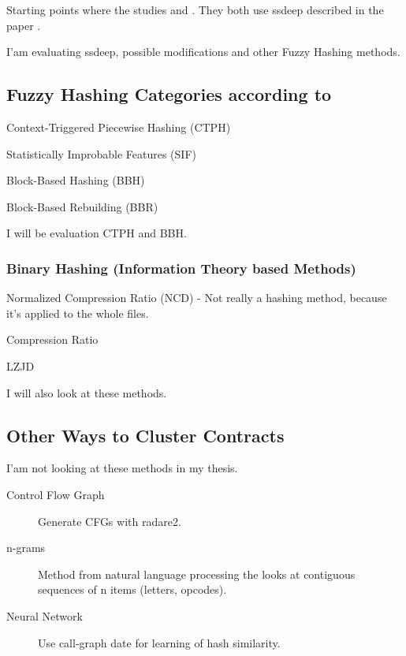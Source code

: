 \documentclass[../main.tex]{subfiles}
\begin{document}
Starting points where the studies  and .
They both use ssdeep\cite{ssdeep} described in the paper .

I'am evaluating ssdeep, possible modifications and other Fuzzy Hashing methods.

\subsection{Fuzzy Hashing Categories according to }
\begin{ul}
  \item Context-Triggered Piecewise Hashing (CTPH)
  \item Statistically Improbable Features (SIF)
  \item Block-Based Hashing (BBH)
  \item Block-Based Rebuilding (BBR)
\end{ul}
I will be evaluation CTPH and BBH.

\subsubsection{Binary Hashing (Information Theory based Methods)}
\begin{ul}
  \item Normalized Compression Ratio (NCD) - Not really a hashing method, because it's applied to the whole files.
  \item Compression Ratio
  \item LZJD
\end{ul}
I will also look at these methods.

\subsection{Other Ways to Cluster Contracts}
I'am not looking at these methods in my thesis.
\begin{description}
  \item[Control Flow Graph] Generate CFGs with radare2.
  \item[n-grams] Method from natural language processing the looks at contiguous sequences of n items (letters, opcodes).
  \item[Neural Network] Use call-graph date for learning of hash similarity.
\end{description}
\end{document}
